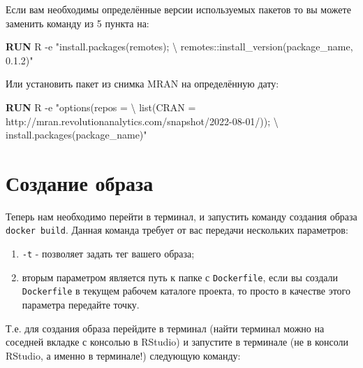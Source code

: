 \documentclass[
]{book}
\newenvironment{Shaded}{\begin{snugshade}}{\end{snugshade}}
\newcommand{\AttributeTok}[1]{\textcolor[rgb]{0.13,0.29,0.53}{#1}}
\newcommand{\DataTypeTok}[1]{\textcolor[rgb]{0.13,0.29,0.53}{#1}}
\newcommand{\ExtensionTok}[1]{#1}
\newcommand{\KeywordTok}[1]{\textcolor[rgb]{0.13,0.29,0.53}{\textbf{#1}}}
\newcommand{\StringTok}[1]{\textcolor[rgb]{0.31,0.60,0.02}{#1}}
\providecommand{\tightlist}{%
  \setlength{\itemsep}{0pt}\setlength{\parskip}{0pt}}
\begin{document}
Если вам необходимы определённые версии используемых пакетов то вы можете заменить команду из 5 пункта на:

\begin{Shaded}
\begin{Highlighting}[]
\KeywordTok{RUN} \ExtensionTok{R} \AttributeTok{{-}e} \StringTok{"install.packages(\textquotesingle{}remotes\textquotesingle{}); }\DataTypeTok{\textbackslash{}}
\StringTok{  remotes::install\_version(\textquotesingle{}package\_name\textquotesingle{}, \textquotesingle{}0.1.2\textquotesingle{})"}
\end{Highlighting}
\end{Shaded}

Или установить пакет из снимка MRAN на определённую дату:

\begin{Shaded}
\begin{Highlighting}[]
\KeywordTok{RUN} \ExtensionTok{R} \AttributeTok{{-}e} \StringTok{"options(repos = }\DataTypeTok{\textbackslash{}}
\StringTok{  list(CRAN = \textquotesingle{}http://mran.revolutionanalytics.com/snapshot/2022{-}08{-}01/\textquotesingle{})); }\DataTypeTok{\textbackslash{}}
\StringTok{  install.packages(\textquotesingle{}package\_name\textquotesingle{})"}
\end{Highlighting}
\end{Shaded}

\section{Создание образа}\label{ux441ux43eux437ux434ux430ux43dux438ux435-ux43eux431ux440ux430ux437ux430}

Теперь нам необходимо перейти в терминал, и запустить команду создания образа \texttt{docker\ build}. Данная команда требует от вас передачи нескольких параметров:

\begin{enumerate}
\def\labelenumi{\arabic{enumi}.}
\tightlist
\item
  \texttt{-t} - позволяет задать тег вашего образа;
\item
  вторым параметром является путь к папке с \texttt{Dockerfile}, если вы создали \texttt{Dockerfile} в текущем рабочем каталоге проекта, то просто в качестве этого параметра передайте точку.
\end{enumerate}

Т.е. для создания образа перейдите в терминал (найти терминал можно на соседней вкладке с консолью в RStudio) и запустите в терминале (не в консоли RStudio, а именно в терминале!) следующую команду:
\end{document}
